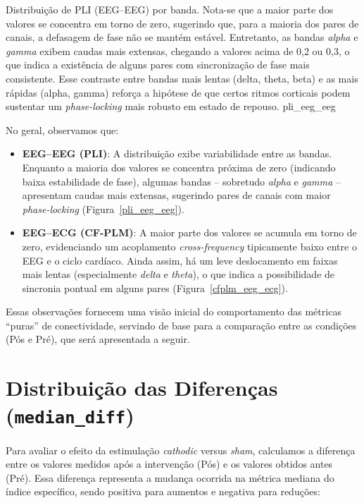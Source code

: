 {Distribuição de PLI (EEG--EEG) por banda. Nota-se que a maior parte dos valores se concentra em torno de zero, sugerindo que, para a maioria dos pares de canais, a defasagem de fase não se mantém estável. Entretanto, as bandas \emph{alpha} e \emph{gamma} exibem caudas mais extensas, chegando a valores acima de 0,2 ou 0,3, o que indica a existência de alguns pares com sincronização de fase mais consistente. Esse contraste entre bandas mais lentas (delta, theta, beta) e as mais rápidas (alpha, gamma) reforça a hipótese de que certos ritmos corticais podem sustentar um \emph{phase-locking} mais robusto em estado de repouso.}
{pli_eeg_eeg}

No geral, observamos que:
\begin{itemize}
    \item \textbf{EEG--EEG (PLI)}: A distribuição exibe variabilidade entre as bandas. Enquanto a maioria dos valores se concentra próxima de zero (indicando baixa estabilidade de fase), algumas bandas -- sobretudo \emph{alpha} e \emph{gamma} -- apresentam caudas mais extensas, sugerindo pares de canais com maior \emph{phase-locking} (Figura~\ref{pli_eeg_eeg}).
    \item \textbf{EEG--ECG (CF-PLM)}: A maior parte dos valores se acumula em torno de zero, evidenciando um acoplamento \textit{cross-frequency} tipicamente baixo entre o EEG e o ciclo cardíaco. Ainda assim, há um leve deslocamento em faixas mais lentas (especialmente \emph{delta} e \emph{theta}), o que indica a possibilidade de sincronia pontual em alguns pares (Figura~\ref{cfplm_eeg_ecg}).
\end{itemize}

Essas observações fornecem uma visão inicial do comportamento das métricas ``puras'' de conectividade, servindo de base para a comparação entre as condições (Pós e Pré), que será apresentada a seguir.

\section{Distribuição das Diferenças (\texttt{median\_diff})}
Para avaliar o efeito da estimulação \textit{cathodic} versus \textit{sham}, calculamos a diferença entre os valores medidos após a intervenção (Pós) e os valores obtidos antes (Pré). Essa diferença representa a mudança ocorrida na métrica mediana do índice específico, sendo positiva para aumentos e negativa para reduções:

